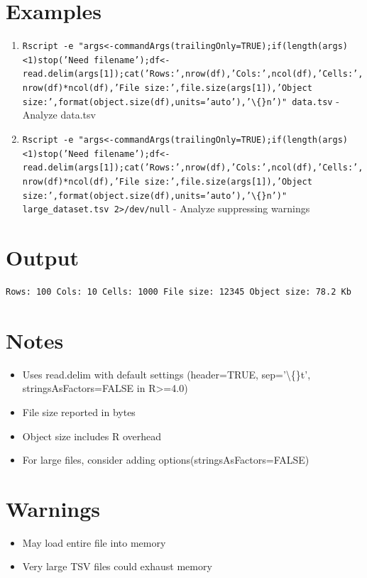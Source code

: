 \documentclass{article}
\begin{document}
\section*{Examples}
\begin{enumerate}
  \item \texttt{Rscript -e "args<-commandArgs(trailingOnly=TRUE);if(length(args)<1)stop('Need filename');df<-read.delim(args[1]);cat('Rows:',nrow(df),'Cols:',ncol(df),'Cells:',nrow(df)*ncol(df),'File size:',file.size(args[1]),'Object size:',format(object.size(df),units='auto'),'\textbackslash\{\}n')" data.tsv} - Analyze data.tsv
  \item \texttt{Rscript -e "args<-commandArgs(trailingOnly=TRUE);if(length(args)<1)stop('Need filename');df<-read.delim(args[1]);cat('Rows:',nrow(df),'Cols:',ncol(df),'Cells:',nrow(df)*ncol(df),'File size:',file.size(args[1]),'Object size:',format(object.size(df),units='auto'),'\textbackslash\{\}n')" large\_dataset.tsv 2>/dev/null} - Analyze suppressing warnings
\end{enumerate}

\section*{Output}
\begin{lstlisting}
Rows: 100 Cols: 10 Cells: 1000 File size: 12345 Object size: 78.2 Kb

\end{lstlisting}

\section*{Notes}
\begin{itemize}
  \item Uses read.delim with default settings (header=TRUE, sep='\textbackslash\{\}t', stringsAsFactors=FALSE in R>=4.0)
  \item File size reported in bytes
  \item Object size includes R overhead
  \item For large files, consider adding options(stringsAsFactors=FALSE)
\end{itemize}

\section*{Warnings}
\begin{itemize}
  \item May load entire file into memory
  \item Very large TSV files could exhaust memory
\end{itemize}
\end{document}
